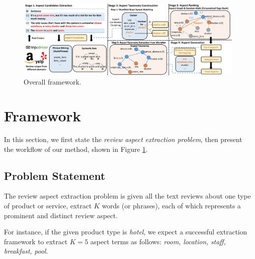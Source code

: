 \documentclass[11pt,a4paper]{article}
\newcommand{\figref}[1]{Figure \ref{#1}}
\begin{document}
\begin{figure}[th!]
	\centering
	\includegraphics[width=\textwidth]{figures/framework-extra}
	\caption{Overall framework.}
	\label{fig:framework}
\end{figure}
\section{Framework}
\label{sec:method}
In this section, we first state the \textit{review aspect extraction problem}, 
then present the workflow of our method, shown in \figref{fig:framework}.

\subsection{Problem Statement}
\label{sec:problem}
The review aspect extraction problem is given all the text reviews about
one type of product or service, extract $K$ words (or phrases), 
each of which represents a prominent and distinct review aspect. 

For instance, if the given product type is \textit{hotel}, 
we expect a successful extraction framework to extract 
$K=5$ aspect terms as follows: 
\textit{room, location, staff, breakfast, pool}.
\end{document}

